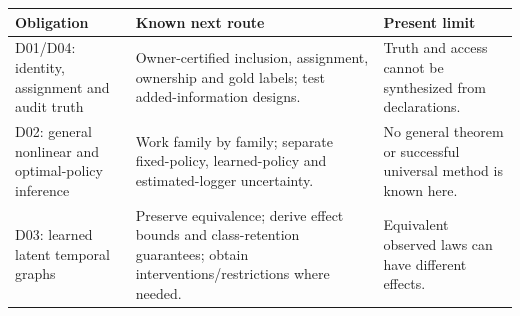 \documentclass[
  11pt,
  a4paper,
]{article}
\begin{document}
\begin{longtable}[]{@{}lll@{}}
\toprule
\begin{minipage}[b]{0.30\columnwidth}\raggedright
Obligation\strut
\end{minipage} & \begin{minipage}[b]{0.30\columnwidth}\raggedright
Known next route\strut
\end{minipage} & \begin{minipage}[b]{0.30\columnwidth}\raggedright
Present limit\strut
\end{minipage}\tabularnewline
\midrule
\endhead
\begin{minipage}[t]{0.30\columnwidth}\raggedright
D01/D04: identity, assignment and audit truth\strut
\end{minipage} & \begin{minipage}[t]{0.30\columnwidth}\raggedright
Owner-certified inclusion, assignment, ownership and gold labels; test
added-information designs.\strut
\end{minipage} & \begin{minipage}[t]{0.30\columnwidth}\raggedright
Truth and access cannot be synthesized from declarations.\strut
\end{minipage}\tabularnewline
\begin{minipage}[t]{0.30\columnwidth}\raggedright
D02: general nonlinear and optimal-policy inference\strut
\end{minipage} & \begin{minipage}[t]{0.30\columnwidth}\raggedright
Work family by family; separate fixed-policy, learned-policy and
estimated-logger uncertainty.\strut
\end{minipage} & \begin{minipage}[t]{0.30\columnwidth}\raggedright
No general theorem or successful universal method is known here.\strut
\end{minipage}\tabularnewline
\begin{minipage}[t]{0.30\columnwidth}\raggedright
D03: learned latent temporal graphs\strut
\end{minipage} & \begin{minipage}[t]{0.30\columnwidth}\raggedright
Preserve equivalence; derive effect bounds and class-retention
guarantees; obtain interventions/restrictions where needed.\strut
\end{minipage} & \begin{minipage}[t]{0.30\columnwidth}\raggedright
Equivalent observed laws can have different effects.\strut
\end{minipage}\tabularnewline

\end{longtable}
\end{document}
